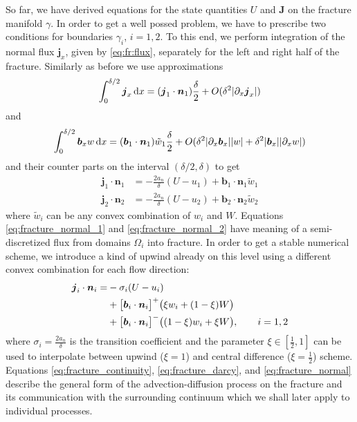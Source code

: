 \documentclass[12pt,a4paper]{report}
\def\prtl{\partial}
\def\vc#1{\mathbf{\boldsymbol{#1}}}     %
\def\abs#1{\lvert#1\rvert}
\def\d {\,{\rm d}}
\begin{document}
So far, we have derived equations for the state quantities $U$ and $\vc J$ on the fracture manifold $\gamma$. In order to
get a well possed problem, we have to prescribe two conditions for boundaries $\gamma_i$, $i=1,2$. To this end, we
perform integration of the normal flux $\vc j_x$, given by \eqref{eq:fr:flux}, separately for the left and right half of the fracture.
Similarly as before we use approximations
\[
 \int_0^{\delta/2} \vc j_x \d x = (\vc j_1 \cdot \vc n_1)\frac{\delta}{2} + O(\delta^2 \abs{\prtl_x \vc j_x})
\]
and 
\[
 \int_0^{\delta/2} \vc b_x w \d x = (\vc b_1 \cdot \vc n_1)\tilde{w}_1\frac{\delta}{2} + O(\delta^2 \abs{\prtl_x \vc b_x}\abs{w} + \delta^2\abs{\vc b_x}\abs{\prtl_x w})
\]
and their counter parts on the interval $(\delta/2, \delta)$ to get
\begin{align}
    \label{eq:fracture_normal_1}
     \vc j_1 \cdot \vc n_1 &= -\frac{2a_n}{\delta} (U - u_1) + \vc b_1\cdot \vc n_1 \tilde{w}_1\\
    \label{eq:fracture_normal_2}
    \vc j_2 \cdot \vc n_2 &= -\frac{2a_n}{\delta} (U - u_2) + \vc b_2\cdot \vc n_2 \tilde{w}_2
\end{align}
where $\tilde w_i$ can be any convex combination of $w_i$ and $W$. Equations \eqref{eq:fracture_normal_1}  
and \eqref{eq:fracture_normal_2} have meaning of a semi-discretized flux from domains $\Omega_i$ into fracture.
In order to get a stable numerical scheme, we introduce a kind of upwind already on this level using a different convex 
combination for each flow direction:
\begin{align}
   \notag 
   \vc j_i \cdot \vc n_i
       = &-\sigma_i (U - u_i)      \\ 
   \notag
      &+ \big[\vc b_i\cdot \vc n_i\big]^{+} \big(\xi w_i + (1-\xi) W\big)       \\
      \label{eq:fracture_normal}
      &+ \big[\vc b_i\cdot \vc n_i\big]^{-} \big((1-\xi) w_i + \xi W\big), \qquad i=1,2
\end{align}
where $\sigma_i = \frac{2a_n}{\delta}$ is the transition coefficient and the parameter $\xi\in [\frac12, 1]$ can be used to interpolate
between upwind ($\xi = 1$) and central difference ($\xi=\frac12$) scheme. Equations \eqref{eq:fracture_continuity}, \eqref{eq:fracture_darcy}, and
\eqref{eq:fracture_normal} describe the general form of the advection-diffusion process on the fracture and its communication with 
the surrounding continuum which we shall later apply to individual processes.
\end{document}
